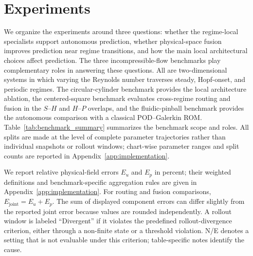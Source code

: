 \documentclass{article}
\begin{document}
\section{Experiments}
\label{sec:experiments}

We organize the experiments around three questions: whether the regime-local specialists support autonomous prediction, whether
physical-space fusion improves prediction near regime transitions, and how the main local architectural choices affect prediction.
The three incompressible-flow benchmarks play complementary roles in answering these questions. All are two-dimensional systems in which varying the Reynolds number traverses steady, Hopf-onset, and periodic regimes. The circular-cylinder benchmark provides the local architecture ablation, the centered-square benchmark evaluates cross-regime routing and fusion in the $S$--$H$ and $H$--$P$ overlaps, and the fluidic-pinball benchmark provides the autonomous comparison with a classical POD--Galerkin ROM. Table~\ref{tab:benchmark_summary} summarizes the benchmark scope and roles. All splits are made at the level of complete parameter trajectories rather than individual snapshots or rollout windows; chart-wise parameter ranges and split counts are reported in Appendix~\ref{app:implementation}.

We report relative physical-field errors $E_u$ and $E_p$ in percent; their weighted definitions and benchmark-specific aggregation rules are given in Appendix~\ref{app:implementation}. For routing and fusion comparisons, $E_{\mathrm{joint}}=E_u+E_p$. The sum of displayed component errors can differ slightly from the reported joint error because values are rounded independently. A rollout window is labeled ``Divergent'' if it violates the predefined rollout-divergence criterion, either through a non-finite state or a
threshold violation. N/E denotes a setting that is not evaluable under this criterion; table-specific notes identify the cause.
\end{document}
